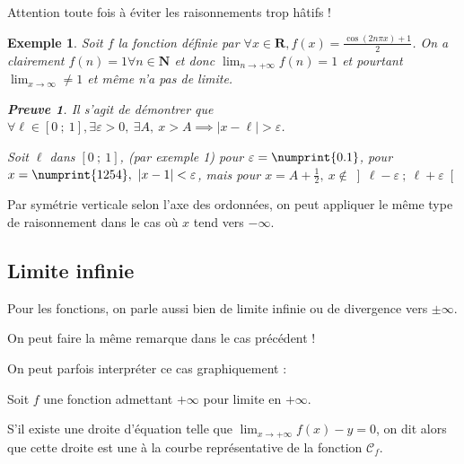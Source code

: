 \documentclass[12pt,a4paper]{article}
\newcommand{\np}{\numprint}
\newcommand{\R}{\mathbf{R}}
\newcommand{\N}{\mathbf{N}}
\newcommand{\vabs}[1]{\left\lvert #1 \right\rvert}
\newcommand{\inff}[2]{\left[#1~;~#2\right]}
\newcommand{\inoo}[2]{\left]#1~;~#2\right[}
\theoremstyle{break}
\newtheorem{definition}{Définition}
\theoremstyle{plain}
\theoremstyle{nonumberplain}
\newtheorem{preuve}{Preuve}
\theoremstyle{nonumberbreak}
\newtheorem{exemple}{Exemple}
\begin{document}
Attention toute fois à éviter les raisonnements trop hâtifs !
\begin{exemple}
  Soit $f$ la fonction définie par $\forall x\in\R, f(x) = \frac{\cos(2n\pi x)
  +1 }{2}$. On a clairement $f(n) = 1 \forall n \in\N$ et donc
  $\lim_{n\to+\infty}f(n) = 1$ et pourtant $\lim_{x\to\infty} \neq 1$ et
  même n'a pas de limite.
  \begin{preuve}
    Il s'agit de démontrer que $\forall\ell\in\inff{0}{1},\exists
    \varepsilon > 0,\ \exists A,\ x > A \implies \vabs{x - \ell} >
    \varepsilon$.

    Soit $\ell$ dans $\inff{0}{1}$, (par exemple 1) pour $\varepsilon =
    \np{0.1}$, pour $x = \np{1254},\ \vabs{x - 1} < \varepsilon$, mais
    pour $x = A + \frac12,\ x\not\in \inoo{\ell - \varepsilon}{\ell +
    \varepsilon}$
  \end{preuve}
\end{exemple}

Par symétrie verticale selon l'axe des ordonnées, on peut appliquer le
même type de raisonnement dans le cas où $x$ tend vers $-\infty$.


\subsection{Limite infinie}

Pour les fonctions, on parle aussi bien de limite infinie ou de
divergence vers $\pm\infty$.


On peut faire la même remarque dans le cas précédent !

On peut parfois interpréter ce cas graphiquement :

\begin{minipage}{0.99\linewidth}
  Soit $f$ une fonction admettant $+\infty$ pour limite en $+\infty$.

  S'il existe une droite d'équation \hspace{2cm} telle que
  $\lim_{x\to+\infty}f(x) - y = 0$, on dit alors que cette droite est
  une \vspace{9mm}\hspace{6cm} à la courbe représentative de la fonction
  $\mathscr{C}_f$.
\end{minipage}
\end{document}
